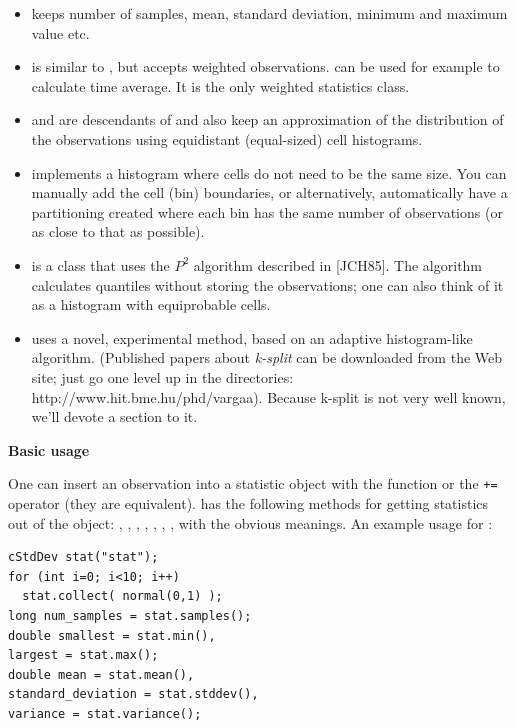 \begin{itemize}
  \item{ keeps number of samples, mean, standard
    deviation, minimum and maximum value etc.}
  \item{ is similar to , but
    accepts weighted observations.  can be used
    for example to calculate time average. It is the only weighted
    statistics class.}
  \item{ and  are
    descendants of  and also keep an approximation of
    the distribution of the observations using equidistant
    (equal-sized) cell histograms.}
  \item{ implements a histogram where cells do not
    need to be the same size. You can manually add the cell (bin)
    boundaries, or alternatively, automatically have a partitioning
    created where each bin has the same number of observations (or as
    close to that as possible).}
  \item{ is a class that uses the $P^{2}$ algorithm
    described in [JCH85]. The algorithm calculates quantiles without
    storing the observations; one can also think of it as a histogram
    with equiprobable cells.}
  \item{ uses a novel, experimental method, based on an
    adaptive histogram-like algorithm. (Published papers about
    \textit{k-split} can be downloaded from the {\opp}
    Web site; just go one level up in the directories:
    http://www.hit.bme.hu/phd/vargaa). Because k-split is not very
    well known, we'll devote a section to it.}
\end{itemize}

\textbf{Basic usage}


One can insert an observation into a statistic object with the
 function or the \texttt{+=} operator (they are
equivalent).   has the following methods for getting
statistics out of the object: , ,
, , , ,
,  with the obvious meanings. An example
usage for :

\begin{Verbatim}
cStdDev stat("stat");
for (int i=0; i<10; i++) 
  stat.collect( normal(0,1) );
long num_samples = stat.samples();
double smallest = stat.min(),
largest = stat.max();
double mean = stat.mean(),
standard_deviation = stat.stddev(),
variance = stat.variance();
\end{Verbatim}







